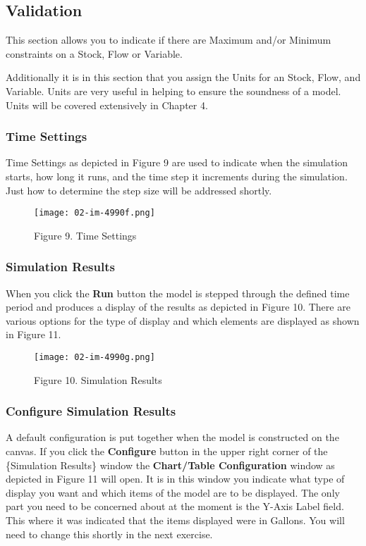 \documentclass[]{memoir}
\let\Oldincludegraphics\includegraphics
\renewcommand{\includegraphics}[1]{\Oldincludegraphics[max size={\textwidth}{\textheight}]{#1}}
\renewcommand{\u}[1]{\textbf{#1}}
\begin{document}
\subsection{Validation}

This section allows you to indicate if there are Maximum and/or Minimum
constraints on a Stock, Flow or Variable.

Additionally it is in this section that you assign the Units for an
Stock, Flow, and Variable. Units are very useful in helping to ensure
the soundness of a model. Units will be covered extensively in Chapter
4.

\subsubsection{Time Settings}

Time Settings as depicted in Figure 9 are used to indicate when the
simulation starts, how long it runs, and the time step it increments
during the simulation. Just how to determine the step size will be
addressed shortly.

\begin{figure}[htbp]
\centering
\texttt{[image: 02-im-4990f.png]}
\caption{Figure 9. Time Settings}
\end{figure}

\subsubsection{Simulation Results}

When you click the \u{Run} button the model is stepped through the
defined time period and produces a display of the results as depicted in
Figure 10. There are various options for the type of display and which
elements are displayed as shown in Figure 11.

\begin{figure}[htbp]
\centering
\texttt{[image: 02-im-4990g.png]}
\caption{Figure 10. Simulation Results}
\end{figure}

\subsubsection{Configure Simulation Results}

A default configuration is put together when the model is constructed on
the canvas. If you click the \u{Configure} button in the upper right
corner of the \{Simulation Results\} window the
\u{Chart/Table Configuration} window as depicted in Figure 11 will open.
It is in this window you indicate what type of display you want and
which items of the model are to be displayed. The only part you need to
be concerned about at the moment is the Y-Axis Label field. This where
it was indicated that the items displayed were in Gallons. You will need
to change this shortly in the next exercise.
\end{document}
